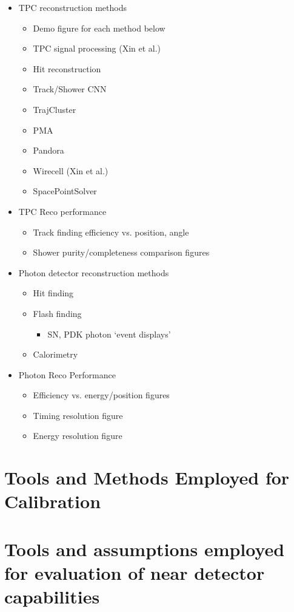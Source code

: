 \begin{itemize}
\item TPC reconstruction methods
\begin{itemize}
\item Demo figure for each method below
\item TPC signal processing (Xin et al.)
\item Hit reconstruction
\item Track/Shower CNN
\item TrajCluster
\item PMA
\item Pandora
\item Wirecell (Xin et al.)
\item SpacePointSolver
\end{itemize}
\item TPC Reco performance
\begin{itemize} 
\item Track finding efficiency vs. position, angle
\item Shower purity/completeness comparison figures 
\end{itemize}
\item Photon detector reconstruction methods
\begin{itemize}
\item Hit finding
\item Flash finding
\begin{itemize} \item SN, PDK photon `event displays' \end{itemize}
\item Calorimetry
\end{itemize}
\item Photon Reco Performance
\begin{itemize}
\item Efficiency vs. energy/position figures
\item Timing resolution figure
\item Energy resolution figure
\end{itemize}
\end{itemize}

\section{Tools and Methods Employed for Calibration }
\label{sec:phys-tools-calib}


\section{Tools and assumptions employed for evaluation of near detector capabilities}
\label{sec:tools-nd-eval}